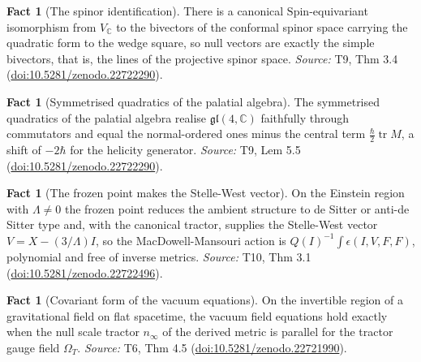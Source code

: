 \documentclass[11pt]{article}
\theoremstyle{definition}
\newtheorem{fact}[theorem]{Fact}
\theoremstyle{plain}
\newcommand{\changedmark}[2]{\marginpar{\raggedright\scriptsize\color{#1}#2}}
\providecommand{\C}{}\renewcommand{\C}{\mathbb{C}}
\providecommand{\Spin}{}\renewcommand{\Spin}{\mathrm{Spin}}
\providecommand{\nInf}{}\renewcommand{\nInf}{n_\infty}
\begin{document}
\begin{fact}[The spinor identification]\label{c:correspondence.spinor-identification}
There is a canonical $\Spin$-equivariant isomorphism from $V_\C$ to the bivectors of the conformal spinor space carrying the quadratic form to the wedge square, so null vectors are exactly the simple bivectors, that is, the lines of the projective spinor space.
\emph{Source:} T9, Thm 3.4 (\href{https://doi.org/10.5281/zenodo.22722290}{doi:10.5281/zenodo.22722290}).
\end{fact}

\begin{fact}[Symmetrised quadratics of the palatial algebra]\label{c:correspondence.symmetrised-quadratics-palatial-algebra}
The symmetrised quadratics of the palatial algebra realise $\mathfrak{gl}(4,\C)$ faithfully through commutators and equal the normal-ordered ones minus the central term $\tfrac{\hbar}{2}\operatorname{tr}M$, a shift of $-2\hbar$ for the helicity generator.
\emph{Source:} T9, Lem 5.5 (\href{https://doi.org/10.5281/zenodo.22722290}{doi:10.5281/zenodo.22722290}).
\end{fact}

\begin{fact}[The frozen point makes the Stelle-West vector]\label{c:dark-energy.frozen-point-makes-stelle-west-vector}
\changedmark{gray}{reworded}
On the Einstein region with $\Lambda\neq 0$ the frozen point reduces the ambient structure to de Sitter or anti-de Sitter type and, with the canonical tractor, supplies the Stelle-West vector $V = X - (3/\Lambda)I$, so the MacDowell-Mansouri action is $Q(I)^{-1}\int\epsilon(I,V,F,F)$, polynomial and free of inverse metrics.
\emph{Source:} T10, Thm 3.1 (\href{https://doi.org/10.5281/zenodo.22722496}{doi:10.5281/zenodo.22722496}).
\end{fact}

\begin{fact}[Covariant form of the vacuum equations]\label{c:interior.covariant-form-vacuum-equations}
On the invertible region of a gravitational field on flat spacetime, the vacuum field equations hold exactly when the null scale tractor $\nInf$ of the derived metric is parallel for the tractor gauge field $\Omega_{T}$.
\emph{Source:} T6, Thm 4.5 (\href{https://doi.org/10.5281/zenodo.22721990}{doi:10.5281/zenodo.22721990}).
\end{fact}
\end{document}
